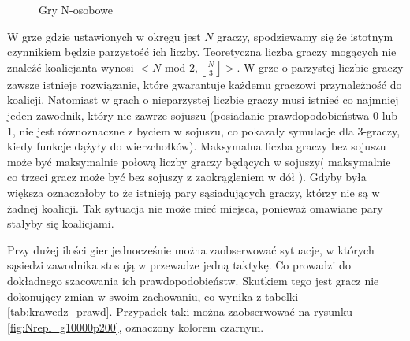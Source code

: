 \begin{figure}
\begin{tabular}{c|c}
	\end{tabular}
\caption{Gry N-osobowe}
\label{fig:repl_10}
\end{figure}
W grze gdzie ustawionych w okręgu jest $N$ graczy, spodziewamy się że istotnym czynnikiem będzie parzystość ich liczby. Teoretyczna liczba graczy mogących nie znaleźć koalicjanta wynosi $< N\text{ mod }2, \left\lfloor \frac{N}{3} \right\rfloor >$. W grze o parzystej liczbie graczy zawsze istnieje rozwiązanie, które gwarantuje każdemu graczowi przynależność do koalicji. Natomiast w grach o nieparzystej liczbie graczy musi istnieć co najmniej jeden zawodnik, który nie zawrze sojuszu (posiadanie prawdopodobieństwa 0 lub 1, nie jest równoznaczne z byciem w sojuszu, co pokazały symulacje dla 3-graczy, kiedy funkcje dążyły do wierzchołków). Maksymalna liczba graczy bez sojuszu może być maksymalnie połową liczby graczy będących w sojuszy( maksymalnie co trzeci gracz może być bez sojuszy z zaokrągleniem w dół ). Gdyby była większa oznaczałoby to że istnieją pary sąsiadujących graczy, którzy nie są w żadnej koalicji. Tak sytuacja nie może mieć miejsca, ponieważ omawiane pary stałyby się koalicjami. 

Przy dużej ilości gier jednocześnie można zaobserwować sytuacje, w których sąsiedzi zawodnika stosują w przewadze jedną taktykę. Co prowadzi do dokładnego szacowania ich prawdopodobieństw. Skutkiem tego jest gracz nie dokonujący zmian w swoim zachowaniu, co wynika z tabelki \ref{tab:krawedz_prawd}. Przypadek taki można zaobserwować na rysunku \ref{fig:Nrepl_g10000p200}, oznaczony kolorem czarnym.

































